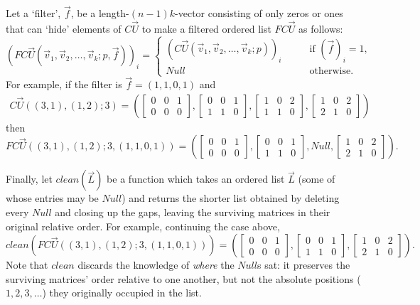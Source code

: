 \label{def:FCU}Let a `filter', $\vec f$, be a length-$(n-1)k$-vector consisting of only zeros or ones that can `hide' elements of $C\vec U$ to make a filtered ordered list
$FC\vec U$ as follows:
$$
   \left( FC\vec U(\vec v_1, \vec v_2, \ldots, \vec v_k; p,\vec f) \right)_i =
    \begin{cases}
    \left( C\vec U(\vec v_1, \vec v_2, \ldots, \vec v_k; p) \right)_i \qquad & \text{if $(\vec f)_i = 1$},\\
    Null & \text{otherwise.}
    \end{cases}
$$
For example, if the filter is $\vec f=(1,1,0,1)$ and 
\begin{align}C\vec U((3,1), (1,2); 3) = \left(
\begin{bmatrix}
0 & 0 & 1 \\
0 & 0 & 0
\end{bmatrix},
\begin{bmatrix}
0 & 0 & 1 \\
1 & 1 & 0 
\end{bmatrix},
\begin{bmatrix}
1 & 0 & 2 \\
1 & 1 & 0
\end{bmatrix},
\begin{bmatrix}
1 & 0 & 2 \\
2 & 1 & 0
\end{bmatrix}
\right)\label{eq:cu3example}
\end{align}
then
$$FC\vec U((3,1), (1,2); 3,(1,1,0,1))
=
\left(
\begin{bmatrix}
0 & 0 & 1 \\
0 & 0 & 0
\end{bmatrix},
\begin{bmatrix}
0 & 0 & 1 \\
1 & 1 & 0 
\end{bmatrix},
Null,
\begin{bmatrix}
1 & 0 & 2 \\
2 & 1 & 0
\end{bmatrix}
\right).
$$

\label{def:clean}Finally, let $clean(\vec L)$ be a function which takes an ordered list $\vec L$ (some of whose entries may be $Null$) and returns the shorter list obtained by deleting every $Null$ and closing up the gaps, leaving the surviving matrices in their original relative order.
For example, continuing the case above,
$$
clean\left( FC\vec U((3,1), (1,2); 3,(1,1,0,1)) \right)
=
\left(
\begin{bmatrix}
0 & 0 & 1 \\
0 & 0 & 0
\end{bmatrix},
\begin{bmatrix}
0 & 0 & 1 \\
1 & 1 & 0
\end{bmatrix},
\begin{bmatrix}
1 & 0 & 2 \\
2 & 1 & 0
\end{bmatrix}
\right).
$$
Note that $clean$ discards the knowledge of \emph{where} the $Null$s sat: it preserves the surviving matrices' order relative to one another, but not the absolute positions ($1,2,3,\ldots$) they originally occupied in the list.

